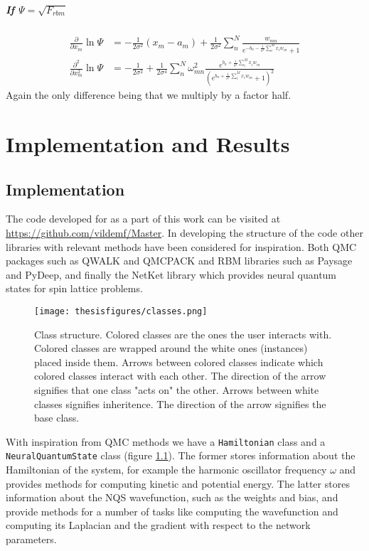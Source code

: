 \documentclass[twoside,english]{uiofysmaster}
\begin{document}
\subsubsection{If $\Psi = \sqrt{F_{rbm}}$}
\begin{align}
	\frac{\partial}{\partial x_m} \ln\Psi
	&= - \frac{1}{2\sigma^2}(x_m - a_m) + \frac{1}{2\sigma^2} \sum_n^N
 	\frac{w_{mn}}{e^{-b_n-\frac{1}{\sigma^2}\sum_i^M x_i w_{in}} + 1}
	\\
	\frac{\partial^2}{\partial x_m^2} \ln\Psi
	&= - \frac{1}{2\sigma^2} + \frac{1}{2\sigma^4}\sum_n^N \omega_{mn}^2 \frac{e^{b_n + \frac{1}{\sigma^2}\sum_i^M x_i w_{in}}}{(e^{b_n + \frac{1}{\sigma^2}\sum_i^M x_i w_{in}} + 1)^2}
\end{align}
Again the only difference being that we multiply by a factor half.


\part{Implementation and Results}
\chapter{Implementation}
The code developed for as a part of this work can be visited at \url{https://github.com/vildemf/Master}. In developing the structure of the code other libraries with relevant methods have been considered for inspiration. Both QMC packages such as QWALK and QMCPACK and RBM libraries such as Paysage and PyDeep, and finally the NetKet library which provides neural quantum states for spin lattice problems. 



\begin{figure}
\centering
 \texttt{[image: thesisfigures/classes.png]}
 \caption{Class structure. Colored classes are the ones the user interacts with. Colored classes are wrapped around the white ones (instances) placed inside them. Arrows between colored classes indicate which colored classes interact with each other. The direction of the arrow signifies that one class "acts on" the other. Arrows between white classes signifies inheritence. The direction of the arrow signifies the base class.}
 \label{fig:classes}
\end{figure}

With inspiration from QMC methods we have a \texttt{Hamiltonian} class and a \texttt{NeuralQuantumState} class (figure \ref{fig:classes}). The former stores information about the Hamiltonian of the system, for example the harmonic oscillator frequency $\omega$ and provides methods for computing kinetic and potential energy. The latter stores information about the NQS wavefunction, such as the weights and bias, and provide methods for a number of tasks like computing the wavefunction and computing its Laplacian and the gradient with respect to the network parameters.
\end{document}
